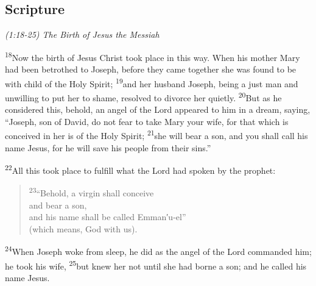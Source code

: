 \documentclass[letterpaper]{report}
\newcommand{\vs}[1]{\textsuperscript{#1}}
\begin{document}
\subsection{Scripture}

{\centering
\emph{(1:18-25) The Birth of Jesus the Messiah}\\
}
\begin{multicols}{2}
\vs{18}Now the birth of Jesus Christ took place in this way.
When his mother Mary had been betrothed to Joseph,
before they came together she was found to be with child of the Holy Spirit;
\vs{19}and her husband Joseph,
being a just man and unwilling to put her to shame,
resolved to divorce her quietly.
\vs{20}But as he considered this,
behold, an angel of the Lord appeared to him in a dream, saying,
``Joseph, son of David, do not fear to take Mary your wife,
for that which is conceived in her is of the Holy Spirit;
\vs{21}she will bear a son, and you shall call his name Jesus,
for he will save his people from their sins.''

\vs{22}All this took place to fulfill what the Lord had spoken by the prophet:

\begin{verse}
\vs{23}``Behold, a virgin shall conceive\\
and bear a son,\\
and his name shall be called Emman′u-el''\\
(which means, God with us).\\
\end{verse}

\vs{24}When Joseph woke from sleep,
he did as the angel of the Lord commanded him;
he took his wife,
\vs{25}but knew her not until she had borne a son;
and he called his name Jesus.
\end{multicols}
\end{document}
